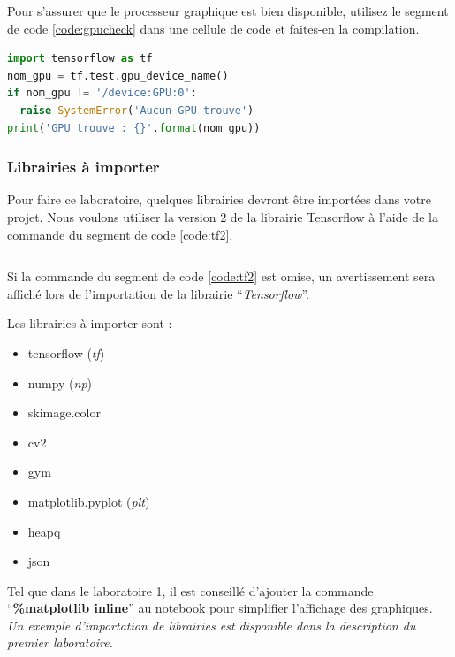 \documentclass{article}
\begin{document}
Pour s'assurer que le processeur graphique est bien disponible, utilisez le segment de code \ref{code:gpucheck} dans une cellule de code et faites-en la compilation.

\begin{lstlisting}[language=Python, caption={Valider la présence du GPU}, label={code:gpucheck}]
%tensorflow_version 2.x
import tensorflow as tf
nom_gpu = tf.test.gpu_device_name()
if nom_gpu != '/device:GPU:0':
  raise SystemError('Aucun GPU trouve')
print('GPU trouve : {}'.format(nom_gpu))
\end{lstlisting}

\subsubsection{Librairies à importer}

Pour faire ce laboratoire, quelques librairies devront être importées dans votre projet. Nous voulons utiliser la version 2 de la librairie Tensorflow à l'aide de la commande du segment de code \ref{code:tf2}.

\begin{lstlisting}[language=Python, caption={Sélectionner la version de Tensorflow}, label={code:tf2}]
%tensorflow_version 2.x
\end{lstlisting}

\smallbreak
Si la commande du segment de code \ref{code:tf2} est omise, un avertissement sera affiché lors de l'importation de la librairie ``\textit{Tensorflow}''.

\smallbreak

Les librairies à importer sont :
\begin{itemize}
  \item tensorflow (\textit{tf})
  \item numpy (\textit{np})
  \item skimage.color
  \item cv2
  \item gym
  \item matplotlib.pyplot (\textit{plt})
  \item heapq
  \item json
\end{itemize}

\bigbreak
Tel que dans le laboratoire 1, il est conseillé d'ajouter la commande ``\textbf{\%matplotlib inline}'' au notebook pour simplifier l'affichage des graphiques.
\smallbreak
\textit{Un exemple d'importation de librairies est disponible dans la description du premier laboratoire.}
\end{document}
